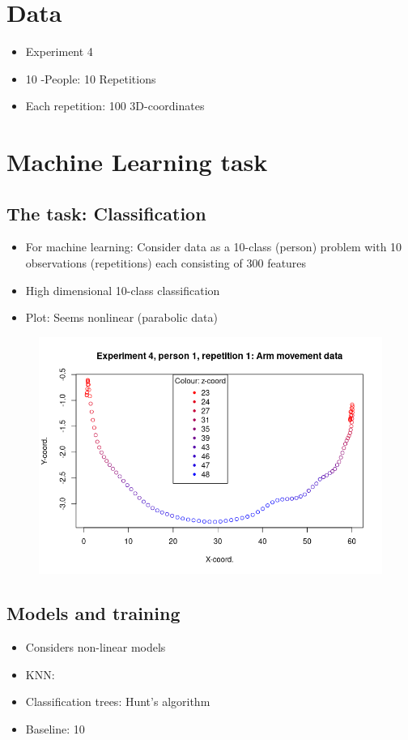 \documentclass[12pt,fleqn]{article}
\title{}
\author{Asger Schultz}
\date{\today}
\begin{document}
\maketitle

\section{Data}
\begin{itemize}
	\item Experiment 4
	\item 10 -People: 10 Repetitions
	\item Each repetition: 100 3D-coordinates
\end{itemize}

\section{Machine Learning task}
\subsection{The task: Classification}
\begin{itemize}
\item For machine learning: Consider data as a 10-class (person) problem with 10 observations (repetitions) each consisting of 300 features 
\item High dimensional 10-class classification 
\item Plot: Seems nonlinear (parabolic data)
\end{itemize}
\begin{figure}[H]
	\centering
	\includegraphics[width=.7\linewidth]{p1_example}
\end{figure}
\subsection{Models and training}
\begin{itemize}
	\item Considers non-linear models
	\item KNN:
	\item Classification trees: Hunt's algorithm
	\item Baseline: 10\pro
\end{itemize}
\end{document}
